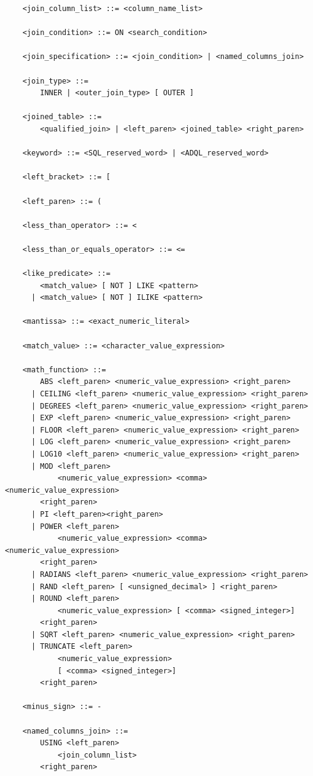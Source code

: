 \documentclass[11pt,a4paper]{ivoa}
\begin{document}
\begin{verbatim}
    <join_column_list> ::= <column_name_list>

    <join_condition> ::= ON <search_condition>

    <join_specification> ::= <join_condition> | <named_columns_join>

    <join_type> ::=
        INNER | <outer_join_type> [ OUTER ]

    <joined_table> ::=
        <qualified_join> | <left_paren> <joined_table> <right_paren>

    <keyword> ::= <SQL_reserved_word> | <ADQL_reserved_word>

    <left_bracket> ::= [

    <left_paren> ::= (

    <less_than_operator> ::= <

    <less_than_or_equals_operator> ::= <=

    <like_predicate> ::=
        <match_value> [ NOT ] LIKE <pattern>
      | <match_value> [ NOT ] ILIKE <pattern>

    <mantissa> ::= <exact_numeric_literal>

    <match_value> ::= <character_value_expression>

    <math_function> ::=
        ABS <left_paren> <numeric_value_expression> <right_paren>
      | CEILING <left_paren> <numeric_value_expression> <right_paren>
      | DEGREES <left_paren> <numeric_value_expression> <right_paren>
      | EXP <left_paren> <numeric_value_expression> <right_paren>
      | FLOOR <left_paren> <numeric_value_expression> <right_paren>
      | LOG <left_paren> <numeric_value_expression> <right_paren>
      | LOG10 <left_paren> <numeric_value_expression> <right_paren>
      | MOD <left_paren>
            <numeric_value_expression> <comma> <numeric_value_expression>
        <right_paren>
      | PI <left_paren><right_paren>
      | POWER <left_paren>
            <numeric_value_expression> <comma> <numeric_value_expression>
        <right_paren>
      | RADIANS <left_paren> <numeric_value_expression> <right_paren>
      | RAND <left_paren> [ <unsigned_decimal> ] <right_paren>
      | ROUND <left_paren>
            <numeric_value_expression> [ <comma> <signed_integer>]
        <right_paren>
      | SQRT <left_paren> <numeric_value_expression> <right_paren>
      | TRUNCATE <left_paren>
            <numeric_value_expression>
            [ <comma> <signed_integer>]
        <right_paren>

    <minus_sign> ::= -

    <named_columns_join> ::=
        USING <left_paren>
            <join_column_list>
        <right_paren>


\end{verbatim}
\end{document}
